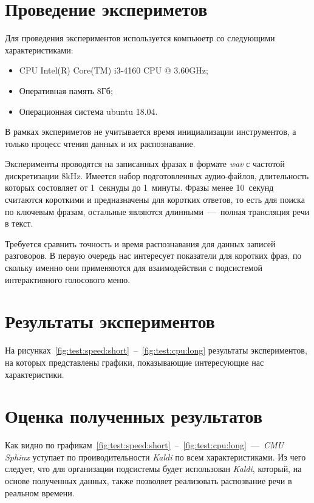 


\section{Проведение экспериметов}
Для проведения экспериментов используется компьюетр со следующими характеристиками:
\begin{itemize}
    \item CPU Intel(R) Core(TM) i3-4160 CPU @ 3.60GHz;
    \item Оперативная память 8Гб;
    \item Операционная система ubuntu 18.04.
\end{itemize}

В рамках экспериметов не учитывается время инициализации инструментов, а только
процесс чтения данных и их распознавание.

Эксперименты проводятся на записанных фразах в формате \textit{wav} с частотой
дискретизации 8kHz. Имеется набор подготовленных аудио-файлов, длительность
которых состовляет от 1~секнуды до 1~минуты.
Фразы менее 10~секунд считаются короткими и предназначены для коротких ответов,
то есть для поиска по ключевым фразам, остальные являются длинными~---~полная
трансляция речи в текст.

Требуется сравнить точность и время распознавания для данных записей разговоров.
В первую очередь нас интересует показатели для коротких фраз, по скольку именно
они применяются для взаимодействия с подсистемой интерактивного голосового меню.

\section{Результаты экспериментов}
На рисунках~\ref{fig:test:speed:short}~--~\ref{fig:test:cpu:long} результаты
экспериментов, на которых представлены графики, показывающие интересующие нас
характеристики.


\clearpage
\section{Оценка полученных результатов}

Как видно по графикам~\ref{fig:test:speed:short}~--~\ref{fig:test:cpu:long}~---~\textit{CMU Sphinx}
уступает по проиводительности \textit{Kaldi} по всем характеристиками.
Из чего следует, что для организации подсистемы будет использован \textit{Kaldi},
который, на основе полученных данных, также позволяет реализовать распозвание речи
в реальном времени.

